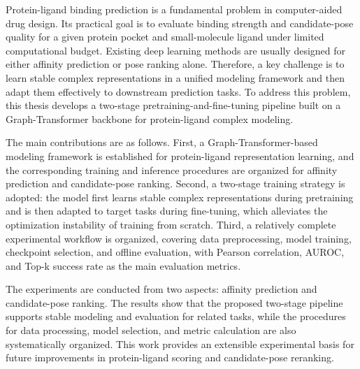 {}

\begin{abstracten}
Protein-ligand binding prediction is a fundamental problem in computer-aided drug design. Its practical goal is to evaluate binding strength and candidate-pose quality for a given protein pocket and small-molecule ligand under limited computational budget. Existing deep learning methods are usually designed for either affinity prediction or pose ranking alone. Therefore, a key challenge is to learn stable complex representations in a unified modeling framework and then adapt them effectively to downstream prediction tasks. To address this problem, this thesis develops a two-stage pretraining-and-fine-tuning pipeline built on a Graph-Transformer backbone for protein-ligand complex modeling.

The main contributions are as follows. First, a Graph-Transformer-based modeling framework is established for protein-ligand representation learning, and the corresponding training and inference procedures are organized for affinity prediction and candidate-pose ranking. Second, a two-stage training strategy is adopted: the model first learns stable complex representations during pretraining and is then adapted to target tasks during fine-tuning, which alleviates the optimization instability of training from scratch. Third, a relatively complete experimental workflow is organized, covering data preprocessing, model training, checkpoint selection, and offline evaluation, with Pearson correlation, AUROC, and Top-k success rate as the main evaluation metrics.

The experiments are conducted from two aspects: affinity prediction and candidate-pose ranking. The results show that the proposed two-stage pipeline supports stable modeling and evaluation for related tasks, while the procedures for data processing, model selection, and metric calculation are also systematically organized. This work provides an extensible experimental basis for future improvements in protein-ligand scoring and candidate-pose reranking.
\end{abstracten}
